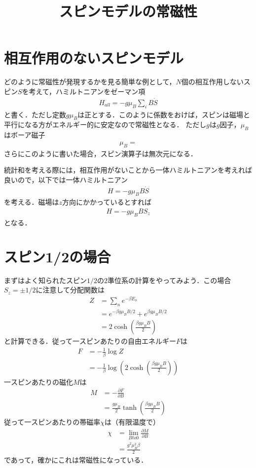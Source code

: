 \documentclass[a4j]{jarticle}
\title{スピンモデルの常磁性}
\begin{document}
\section{相互作用のないスピンモデル}
どのように常磁性が発現するかを見る簡単な例として，$N$個の相互作用しないスピン$S$を考えて，ハミルトニアンをゼーマン項
\begin{align*}
 H_{all}=-g\mu_B\sum_{i}B\dot S
\end{align*}
と書く．ただし定数$g\mu_B$は正とする．このように係数をおけば，スピンは磁場と平行になる方がエネルギー的に安定なので常磁性となる．
ただし$g$は$g$因子，$\mu_B$はボーア磁子
\begin{align*}
 \mu_B=
\end{align*}
さらにこのように書いた場合，スピン演算子は無次元になる．




統計和を考える際には，相互作用がないことから一体ハミルトニアンを考えれば良いので，以下では一体ハミルトニアン
\begin{align*}
 H=-g\mu_BB\dot S
\end{align*}
を考える．磁場は$z$方向にかかっているとすれば
\begin{align*}
 H=-g\mu_BBS_z
\end{align*}
となる．

\section{スピン1/2の場合}
まずはよく知られたスピン$1/2$の$2$準位系の計算をやってみよう．この場合$S_z=\pm 1/2$に注意して分配関数は
\begin{align*}
 Z&=\sum_{n}e^{-\beta E_n} \\
&=e^{-\beta g\mu_BB/2}+e^{\beta g\mu_BB/2} \\
&=2\cosh\left(\frac{\beta g\mu_BB}{2}\right)
\end{align*}
と計算できる．従って一スピンあたりの自由エネルギー$F$は
\begin{align*}
 F&=-\frac{1}{\beta}\log Z \\
&=-\frac{1}{\beta}\log\left(2\cosh\left(\frac{\beta g\mu_BB}{2}\right)\right)
\end{align*}
一スピンあたりの磁化$M$は
\begin{align*}
 M&=-\frac{\partial F}{\partial B} \\
&=\frac{g\mu_B}{2 }\tanh\left(\frac{\beta g\mu_BB}{2}\right)
\end{align*}
従って一スピンあたりの帯磁率$\chi$は（有限温度で）
\begin{align*}
 \chi&=\lim_{B to 0}\frac{\partial M}{\partial B} \\ 
 &=\frac{g^2\mu_B^2\beta}{2}
\end{align*}
であって，確かにこれは常磁性になっている．
\end{document}
